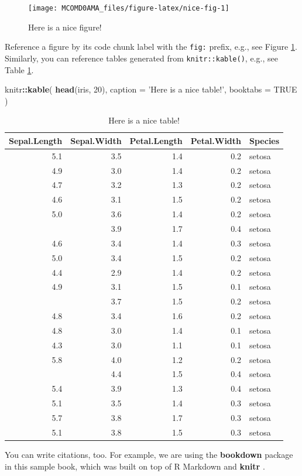 \documentclass[
]{book}
\newenvironment{Shaded}{\begin{snugshade}}{\end{snugshade}}
\newcommand{\DataTypeTok}[1]{\textcolor[rgb]{0.13,0.29,0.53}{#1}}
\newcommand{\DecValTok}[1]{\textcolor[rgb]{0.00,0.00,0.81}{#1}}
\newcommand{\KeywordTok}[1]{\textcolor[rgb]{0.13,0.29,0.53}{\textbf{#1}}}
\newcommand{\NormalTok}[1]{#1}
\newcommand{\OperatorTok}[1]{\textcolor[rgb]{0.81,0.36,0.00}{\textbf{#1}}}
\newcommand{\OtherTok}[1]{\textcolor[rgb]{0.56,0.35,0.01}{#1}}
\newcommand{\StringTok}[1]{\textcolor[rgb]{0.31,0.60,0.02}{#1}}
\begin{document}
\begin{figure}

{\centering \texttt{[image: MCOMD0AMA\_files/figure-latex/nice-fig-1]} 

}

\caption{Here is a nice figure!}\label{fig:nice-fig}
\end{figure}

Reference a figure by its code chunk label with the \texttt{fig:} prefix, e.g., see Figure \ref{fig:nice-fig}. Similarly, you can reference tables generated from \texttt{knitr::kable()}, e.g., see Table \ref{tab:nice-tab}.

\begin{Shaded}
\begin{Highlighting}[]
\NormalTok{knitr}\OperatorTok{::}\KeywordTok{kable}\NormalTok{(}
  \KeywordTok{head}\NormalTok{(iris, }\DecValTok{20}\NormalTok{), }\DataTypeTok{caption =} \StringTok{'Here is a nice table!'}\NormalTok{,}
  \DataTypeTok{booktabs =} \OtherTok{TRUE}
\NormalTok{)}
\end{Highlighting}
\end{Shaded}

\begin{table}

\caption{\label{tab:nice-tab}Here is a nice table!}
\centering
\begin{tabular}[t]{rrrrl}
\toprule
Sepal.Length & Sepal.Width & Petal.Length & Petal.Width & Species\\
\midrule
5.1 & 3.5 & 1.4 & 0.2 & setosa\\
4.9 & 3.0 & 1.4 & 0.2 & setosa\\
4.7 & 3.2 & 1.3 & 0.2 & setosa\\
4.6 & 3.1 & 1.5 & 0.2 & setosa\\
5.0 & 3.6 & 1.4 & 0.2 & setosa\\
\addlinespace
5.4 & 3.9 & 1.7 & 0.4 & setosa\\
4.6 & 3.4 & 1.4 & 0.3 & setosa\\
5.0 & 3.4 & 1.5 & 0.2 & setosa\\
4.4 & 2.9 & 1.4 & 0.2 & setosa\\
4.9 & 3.1 & 1.5 & 0.1 & setosa\\
\addlinespace
5.4 & 3.7 & 1.5 & 0.2 & setosa\\
4.8 & 3.4 & 1.6 & 0.2 & setosa\\
4.8 & 3.0 & 1.4 & 0.1 & setosa\\
4.3 & 3.0 & 1.1 & 0.1 & setosa\\
5.8 & 4.0 & 1.2 & 0.2 & setosa\\
\addlinespace
5.7 & 4.4 & 1.5 & 0.4 & setosa\\
5.4 & 3.9 & 1.3 & 0.4 & setosa\\
5.1 & 3.5 & 1.4 & 0.3 & setosa\\
5.7 & 3.8 & 1.7 & 0.3 & setosa\\
5.1 & 3.8 & 1.5 & 0.3 & setosa\\
\bottomrule
\end{tabular}
\end{table}

You can write citations, too. For example, we are using the \textbf{bookdown} package \citep{R-bookdown} in this sample book, which was built on top of R Markdown and \textbf{knitr} \citep{xie2015}.

  
\end{document}
